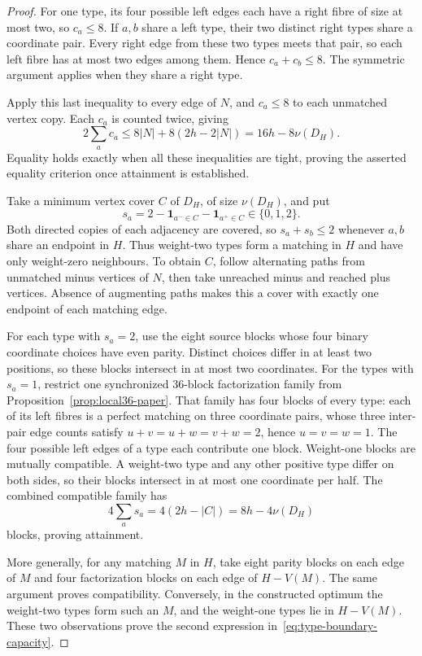 \begin{proof}
For one type, its four possible left edges each have a right fibre
of size at most two, so $c_a\le8$. If $a,b$ share a left type, their
two distinct right types share a coordinate pair. Every right edge
from these two types meets that pair, so each left fibre has at most
two edges among them. Hence $c_a+c_b\le8$. The symmetric argument
applies when they share a right type.

Apply this last inequality to every edge of $N$, and $c_a\le8$ to
each unmatched vertex copy. Each $c_a$ is counted twice, giving
\[
 2\sum_a c_a\le8|N|+8(2h-2|N|)=16h-8\nu(D_H).
\]
Equality holds exactly when all these inequalities are tight, proving
the asserted equality criterion once attainment is established.

Take a minimum vertex cover $C$ of $D_H$, of size $\nu(D_H)$, and put
\[
 s_a=2-\boldsymbol1_{a^-\in C}-\boldsymbol1_{a^+\in C}\in\{0,1,2\}.
\]
Both directed copies of each adjacency are covered, so
$s_a+s_b\le2$ whenever $a,b$ share an endpoint in $H$.
Thus weight-two types form a matching in $H$ and have only weight-zero
neighbours. To obtain $C$, follow alternating paths from unmatched minus
vertices of $N$, then take unreached minus and reached plus vertices.
Absence of augmenting paths makes this a cover with exactly one endpoint
of each matching edge.

For each type with $s_a=2$, use the eight source blocks whose four
binary coordinate choices have even parity. Distinct choices differ
in at least two positions, so these blocks intersect in at most two
coordinates. For the types with $s_a=1$, restrict one synchronized
36-block factorization family from
Proposition~\ref{prop:local36-paper}. That family has four blocks of
every type: each of its left fibres is a perfect matching on three
coordinate pairs, whose three inter-pair edge counts satisfy
$u+v=u+w=v+w=2$, hence $u=v=w=1$.
The four possible left edges of a type each contribute one block.
Weight-one blocks are mutually compatible. A weight-two type and any
other positive type differ on both sides, so their blocks intersect in
at most one coordinate per half. The combined compatible family has
\[
 4\sum_a s_a=4(2h-|C|)=8h-4\nu(D_H)
\]
blocks, proving attainment.

More generally, for any matching $M$ in $H$, take eight parity blocks
on each edge of $M$ and four factorization blocks on each edge of
$H-V(M)$. The same argument proves compatibility. Conversely, in
the constructed optimum the weight-two types form such an $M$, and
the weight-one types lie in $H-V(M)$. These two observations prove
the second expression in~\eqref{eq:type-boundary-capacity}.
\end{proof}

